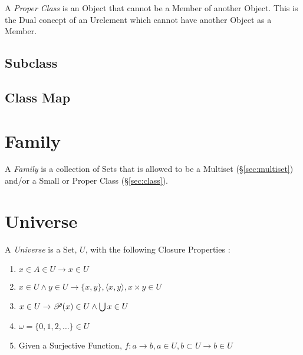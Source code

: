 A \emph{Proper Class} is an Object that cannot be a Member of another
Object. This is the Dual concept of an Urelement which cannot have
another Object as a Member.



\subsection{Subclass}\label{sec:subclass}

\subsection{Class Map}\label{sec:class_map}



\section{Family}\label{sec:family}

A \emph{Family} is a collection of Sets that is allowed to be a
Multiset (\S\ref{sec:multiset}) and/or a Small or Proper Class
(\S\ref{sec:class}).



\section{Universe}\label{sec:set_universe}

A \emph{Universe} is a Set, $U$, with the following Closure Properties
\cite{maclane69}:
\begin{enumerate}
\item $x \in A \in U \rightarrow x \in U$
\item $x \in U \wedge y \in U \rightarrow \{x,y\}, \langle x,y
  \rangle, x \times y \in U$
\item $x \in U \rightarrow \mathscr{P}(x) \in U \wedge \bigcup x \in U$
\item $\omega = \{0,1,2,\ldots\} \in U$
\item Given a Surjective Function, $f : a \rightarrow b, a \in
  U, b \subset U \rightarrow b \in U$
\end{enumerate}

